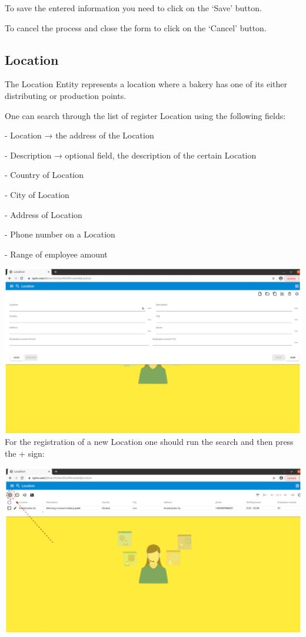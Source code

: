 To save the entered information you need to click on the ‘Save’ button. 

To cancel the process and close the form to click on the ‘Cancel' button.

\subsection{Location}

The Location Entity represents a location where a bakery has one of its either distributing or production points. 

One can search through the list of register Location using the following fields:

- Location → the address of the Location

- Description → optional field, the description of the certain Location 

- Country of Location

- City of Location

- Address of Location

- Phone number on a Location

- Range of employee amount

\includegraphics[width=\textwidth]{sections/01-chapter/images/location1.png}\\

For the registration of a new Location one should run the search and then press the + sign:

\includegraphics[width=\textwidth]{sections/01-chapter/images/location2.png}\\

